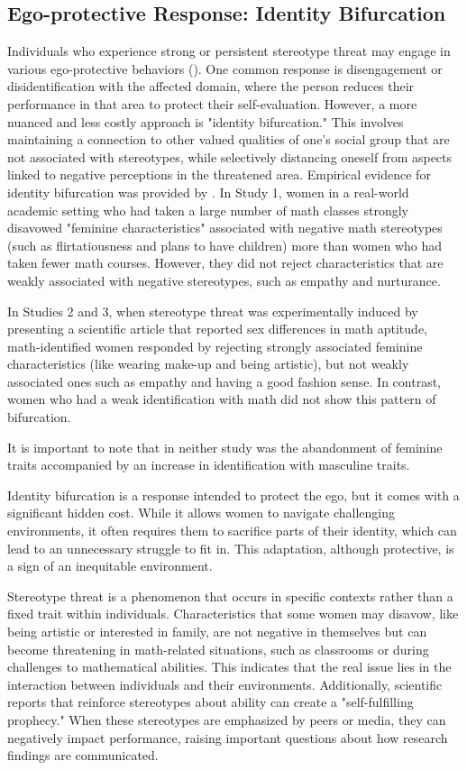\subsection{Ego-protective Response: Identity Bifurcation}
Individuals who experience strong or persistent stereotype threat may engage in various ego-protective behaviors (\cite{SnyderMiene1994}). One common response is disengagement or disidentification with the affected domain, where the person reduces their performance in that area to protect their self-evaluation. However, a more nuanced and less costly approach is "identity bifurcation." This involves maintaining a connection to other valued qualities of one’s social group that are not associated with stereotypes, while selectively distancing oneself from aspects linked to negative perceptions in the threatened area.
Empirical evidence for identity bifurcation was provided by \textcite{pro}. In Study 1, women in a real-world academic setting who had taken a large number of math classes strongly disavowed "feminine characteristics" associated with negative math stereotypes (such as flirtatiousness and plans to have children) more than women who had taken fewer math courses. However, they did not reject characteristics that are weakly associated with negative stereotypes, such as empathy and nurturance. 

In Studies 2 and 3, when stereotype threat was experimentally induced by presenting a scientific article that reported sex differences in math aptitude, math-identified women responded by rejecting strongly associated feminine characteristics (like wearing make-up and being artistic), but not weakly associated ones such as empathy and having a good fashion sense. In contrast, women who had a weak identification with math did not show this pattern of bifurcation. 

It is important to note that in neither study was the abandonment of feminine traits accompanied by an increase in identification with masculine traits.

Identity bifurcation is a response intended to protect the ego, but it comes with a significant hidden cost. While it allows women to navigate challenging environments, it often requires them to sacrifice parts of their identity, which can lead to an unnecessary struggle to fit in. This adaptation, although protective, is a sign of an inequitable environment.

Stereotype threat is a phenomenon that occurs in specific contexts rather than a fixed trait within individuals. Characteristics that some women may disavow, like being artistic or interested in family, are not negative in themselves but can become threatening in math-related situations, such as classrooms or during challenges to mathematical abilities. This indicates that the real issue lies in the interaction between individuals and their environments.
Additionally, scientific reports that reinforce stereotypes about ability can create a "self-fulfilling prophecy." When these stereotypes are emphasized by peers or media, they can negatively impact performance, raising important questions about how research findings are communicated.

